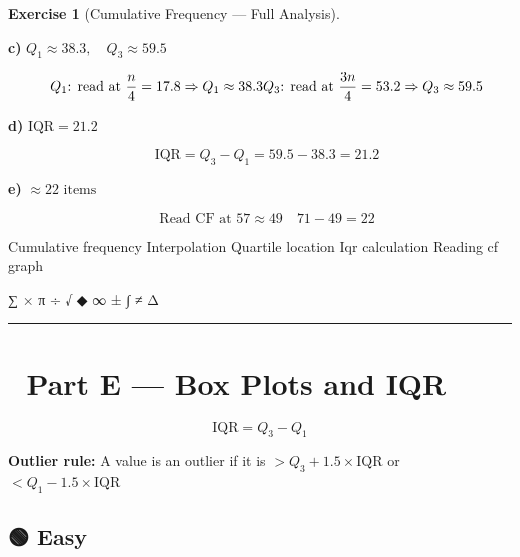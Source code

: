 \documentclass[
  letterpaper,
  DIV=11,
  numbers=noendperiod]{scrreprt}
\theoremstyle{definition}
\newtheorem{exercise}{Exercise}[chapter]
\theoremstyle{remark}
\begin{document}
\begin{exercise}[Cumulative Frequency --- Full
Analysis]
\begin{tcolorbox}
\textbf{c)} \(Q_1 \approx 38.3,\quad Q_3 \approx 59.5\)

\[\quad Q_1\text{: read at }\frac{n}{4}=17.8\Rightarrow Q_1\approx38.3\\[4pt]Q_3\text{: read at }\frac{3n}{4}=53.2\Rightarrow Q_3\approx59.5\]

\textbf{d)} \(\text{IQR} = 21.2\)

\[\quad \text{IQR} = Q_3 - Q_1 = 59.5 - 38.3 = 21.2\]

\textbf{e)} \(\approx 22\text{ items}\)

\[\quad \text{Read CF at }57\approx49\quad 71-49=22\]

\end{tcolorbox}

{Cumulative frequency} {Interpolation} {Quartile location} {Iqr
calculation} {Reading cf graph}

\end{exercise}

∑ × π ÷ √ ◆ ∞ ± ∫ ≠ Δ

\begin{center}\rule{0.5\linewidth}{0.5pt}\end{center}

\section{🎯 Part E --- Box Plots and IQR}\label{sec-boxplot}

\begin{tcolorbox}[enhanced jigsaw, opacitybacktitle=0.6, coltitle=black, arc=.35mm, colframe=quarto-callout-note-color-frame, colback=white, bottomrule=.15mm, left=2mm, colbacktitle=quarto-callout-note-color!10!white, titlerule=0mm, opacityback=0, title={🔑 Key Points}, leftrule=.75mm, breakable, rightrule=.15mm, bottomtitle=1mm, toptitle=1mm, toprule=.15mm]

\[\text{IQR} = Q_3 - Q_1\]

\textbf{Outlier rule:} A value is an outlier if it is
\(> Q_3 + 1.5 \times \text{IQR}\) or \(< Q_1 - 1.5 \times \text{IQR}\)

\end{tcolorbox}

\subsection{🟢 Easy}
\end{document}

